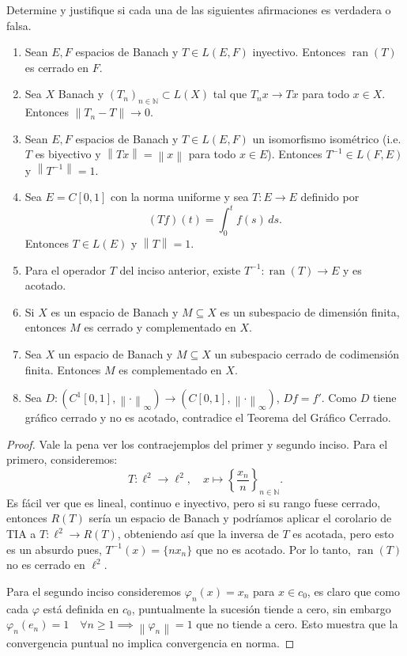 \documentclass{article}
\theoremstyle{definition}
\newcommand{\N}{\mathbb{N}}
\newcommand{\norm}[1]{\left\lVert #1 \right\rVert}       %
\newcommand{\ran}{\operatorname{ran}}
\newenvironment{ejercicio}[1]{\begin{trivlist}
\item[\hskip \labelsep {\bfseries Ejercicio}\hskip \labelsep {\bfseries #1.}]}{\end{trivlist}}
\begin{document}
\begin{ejercicio}{1}
    Determine y justifique si cada una de las siguientes afirmaciones es verdadera o falsa.
    \begin{enumerate}
        \item Sean \( E, F \) espacios de Banach y \( T \in L(E,F) \) inyectivo. Entonces \( \ran(T) \) es cerrado en \( F \).
        \item Sea \( X \) Banach y \( {(T_n)}_{n\in\N} \subset L(X) \) tal que \( T_n x \to Tx \) para todo \( x \in X \). Entonces \( \norm{T_n - T} \to 0 \).
        \item Sean \( E, F \) espacios de Banach y \( T \in L(E,F) \) un isomorfismo isométrico (i.e. \( T \) es biyectivo y \( \norm{Tx} = \norm{x} \) para todo \( x \in E \)). Entonces \( T^{-1} \in L(F,E) \) y \( \norm{T^{-1}} = 1 \).
        \item Sea \( E = C[0,1] \) con la norma uniforme y sea \( T : E \to E \) definido por
              \[
                  (Tf)(t) = \int_0^t f(s)\, ds.
              \]
              Entonces \( T \in L(E) \) y \( \norm{T} = 1 \).
        \item Para el operador \( T \) del inciso anterior, existe \( T^{-1} : \ran(T) \to E \) y es acotado.
        \item Si \( X \) es un espacio de Banach y \( M \subseteq X \) es un subespacio de dimensión finita, entonces \( M \) es cerrado y complementado en \( X \).

        \item Sea \( X \) un espacio de Banach y \( M \subseteq X \) un subespacio cerrado de codimensión finita. Entonces \( M \) es complementado en \( X \).
        \item Sea \( D : (C^1[0,1], \norm{\cdot}_\infty) \to (C[0,1], \norm{\cdot}_\infty) \), \( Df = f' \). Como \( D \) tiene gráfico cerrado y no es acotado, contradice el Teorema del Gráfico Cerrado.
    \end{enumerate}
\end{ejercicio}
\begin{proof}
    Vale la pena ver los contraejemplos del primer y segundo inciso. Para el primero, consideremos: \[
        T: \ell^2 \to \ell^2, \quad x \mapsto {\left \{\frac{x_n}{n} \right \}}_{n\in\N}.
    \]
    Es fácil ver que es lineal, continuo e inyectivo, pero si su rango fuese cerrado, entonces \( R(T) \) sería un espacio de Banach y podríamos aplicar el corolario de TIA a \( T: \ell^2 \to R(T) \), obteniendo así que la inversa de \( T \) es acotada, pero esto es un absurdo pues, \( T^{-1}(x) = \{ n x_n \} \) que no es acotado. Por lo tanto, \( \ran(T) \) no es cerrado en \( \ell^2 \).

    Para el segundo inciso consideremos \( \varphi_n(x) = x_n \) para \( x \in c_0 \), es claro que como cada \( \varphi \) está definida en \( c_0 \), puntualmente la sucesión tiende a cero, sin embargo \( \varphi_n(e_n) = 1 \quad \forall n \ge 1 \implies \norm{\varphi_n} = 1 \) que no tiende a cero. Esto muestra que la convergencia puntual no implica convergencia en norma.
\end{proof}
\end{document}
